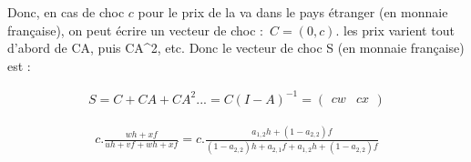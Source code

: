\documentclass[11pt,a4paper]{article}
\begin{document}
Donc, en cas de choc $c$ pour le prix de la va dans le pays étranger (en monnaie française), on peut écrire un vecteur de choc : $C=\left(0,c\right)$.  les prix varient tout d'abord de  CA, puis CA^2, etc. Donc le vecteur de choc S (en monnaie française) est : 


\begin{eqnarray}
S=C+CA+CA^2...=C(I-A)^{-1}=\left(\begin{matrix}cw  &   cx\end{matrix}\right)
\end{eqnarray}

\begin{eqnarray}
c.\frac{wh+xf}{uh+vf+wh+xf}=c.\frac{a_{1,2}h+\left(1-a_{2,2}\right)f}{\left(1-a_{2,2}\right)h+a_{2,1}f+a_{1,2}h+\left(1-a_{2,2}\right)f}
\end{eqnarray}
\end{document}
